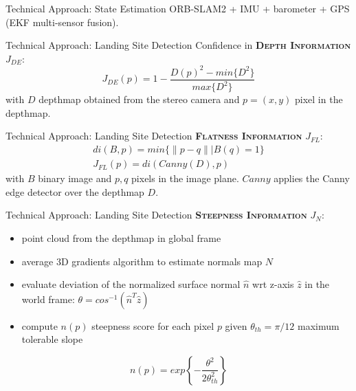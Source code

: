 \documentclass[10pt]{beamer}
\begin{document}
    \begin{frame}{Technical Approach: State Estimation}
        ORB-SLAM2 + IMU + barometer + GPS (EKF multi-sensor fusion).
    \end{frame}

    \begin{frame}{Technical Approach: Landing Site Detection}
        \justifying
        Confidence in \textbf{\textsc{Depth Information}} $J_{DE}$:
        \begin{equation*}
            J_{DE}(p) = 1 - \frac{D(p)^2 - min\{D^2\}}{max\{D^2\}}
        \end{equation*}
        with $D$ depthmap obtained from the stereo camera and $p=(x,y)$
        pixel in the depthmap.
    \end{frame}

    \begin{frame}{Technical Approach: Landing Site Detection}
        \justifying
        \textbf{\textsc{Flatness Information}} $J_{FL}$:
        \begin{gather*}
            di(B, p) = min\Big\{\|p-q\| \Big| B(q)=1\Big\} \\
            J_{FL}(p) = di(Canny(D), p)
        \end{gather*}
        with $B$ binary image and $p, q$ pixels in the image plane. $Canny$
        applies the Canny edge detector over the depthmap $D$.
    \end{frame}

    \begin{frame}{Technical Approach: Landing Site Detection}
        \justifying
        \textbf{\textsc{Steepness Information}} $J_{N}$:
        \begin{itemize}
            \item point cloud from the depthmap in global frame
            \item average 3D gradients algorithm to estimate normals map $N$
            \item evaluate deviation of the normalized surface normal
                $\hat{n}$ wrt z-axis $\hat{z}$ in the world frame:
                $\theta = cos^{-1}(\hat{n}^T\hat{z})$
            \item compute $n(p)$ steepness score for each pixel $p$ given
                $\theta_{th}=\pi/12$ maximum tolerable slope
        \end{itemize}
        \begin{equation*}
            n(p) = exp\left\{ -\frac{\theta^2}{2\theta^2_{th}} \right\}
        \end{equation*}
    \end{frame}
\end{document}

